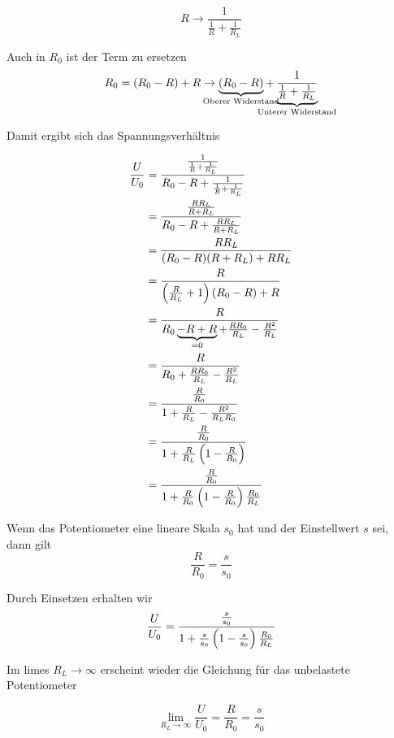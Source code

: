 \begin{equation}
  R \to \frac{1}{\frac{1}{R} + \frac{1}{R_L}}
\end{equation}

Auch in $R_0$ ist der Term zu ersetzen
\begin{equation}
  R_0 = (R_0 - R) + R \to \underbrace{(R_0 - R)}_{\mathclap{\text{Oberer Widerstand}}} + \underbrace{\frac{1}{\frac{1}{R} + \frac{1}{R_L}}}_{\mathclap{\text{Unterer Widerstand}}}
\end{equation}

Damit ergibt sich das Spannungsverhältnis

\begin{align}
  \frac{U}{U_0} &= \frac{\frac{1}{\frac{1}{R} + \frac{1}{R_L}}}{R_0 - R + \frac{1}{\frac{1}{R} + \frac{1}{R_L}}} \\
                &= \frac{\frac{RR_L}{R+R_L}}{R_0 - R + \frac{RR_L}{R+R_L}} \\
                &= \frac{R R_L}{(R_0 -R)(R + R_L) + R R_L} \\
                &= \frac{R}{\del{\frac{R}{R_L} + 1}(R_0 - R) + R} \\
                &= \frac{R}{R_0 \underbrace{- R + R}_{=0} + \frac{R R_0}{R_L} - \frac{R^2}{R_L}} \\
                &= \frac{R}{R_0 + \frac{RR_0}{R_L} - \frac{R^2}{R_L}} \\
                &= \frac{\frac{R}{R_0}}{1+\frac{R}{R_L} - \frac{R^2}{R_LR_0}} \\
                &= \frac{\frac{R}{R_0}}{1 + \frac{R}{R_L} \del{1-\frac{R}{R_0}}} \\
                &= \frac{\frac{R}{R_0}}{1 + \frac{R}{R_0} \del{1-\frac{R}{R_0}} \frac{R_0}{R_L}}
\end{align}

Wenn das Potentiometer eine lineare Skala $s_0$ hat und der Einstellwert $s$
sei, dann gilt
\begin{equation}
  \frac{R}{R_0} = \frac{s}{s_0}
\end{equation}

Durch Einsetzen erhalten wir
\begin{equation}
  \frac{U}{U_0} = \frac{\frac{s}{s_0}}{1 + \frac{s}{s_0} \del{1-\frac{s}{s_0}} \frac{R_0}{R_L}}
\end{equation}

Im limes $R_L \to \infty$ erscheint wieder die Gleichung für das unbelastete
Potentiometer

\begin{equation}
  \lim_{R_L \to \infty} \frac{U}{U_0} = \frac{R}{R_0} = \frac{s}{s_0}
\end{equation}


